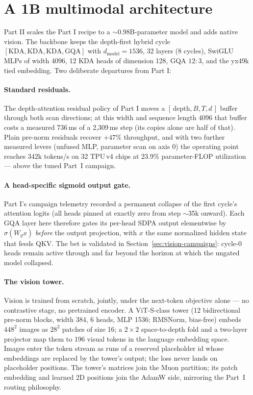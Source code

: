 \section{A 1B multimodal architecture}
\label{sec:vision-arch}

Part II scales the Part I recipe to a $\sim$0.98B-parameter model and
adds native vision. The backbone keeps the depth-first hybrid cycle
\([\mathrm{KDA},\mathrm{KDA},\mathrm{KDA},\mathrm{GQA}]\) with
\(d_{\mathrm{model}}{=}1536\), 32 layers (8 cycles), SwiGLU MLPs of
width 4096, 12 KDA heads of dimension 128, GQA \(12{:}3\), and the
yx49k tied embedding. Two deliberate departures from Part I:

\paragraph{Standard residuals.} The depth-attention residual policy of
Part I moves a \([\,\text{depth},B,T,d\,]\) buffer through both scan
directions; at this width and sequence length 4096 that buffer costs a
measured 736\,ms of a 2{,}309\,ms step (its copies alone are half of
that). Plain pre-norm residuals recover $+47\%$ throughput, and with
two further measured levers (unfused MLP, parameter scan on axis 0)
the operating point reaches 342k tokens/s on 32 TPU\,v4 chips at
23.9\% parameter-FLOP utilization --- above the tuned Part~I campaign.

\paragraph{A head-specific sigmoid output gate.} Part I's campaign
telemetry recorded a permanent collapse of the first cycle's attention
logits (all heads pinned at exactly zero from step $\sim$35k onward).
Each GQA layer here therefore gates its per-head SDPA output
elementwise by \(\sigma(W_g x)\) \emph{before} the output projection,
with \(x\) the same normalized hidden state that feeds QKV. The bet is
validated in Section~\ref{sec:vision-campaigns}: cycle-0 heads remain
active through and far beyond the horizon at which the ungated model
collapsed.

\paragraph{The vision tower.} Vision is trained from scratch, jointly,
under the next-token objective alone --- no contrastive stage, no
pretrained encoder. A ViT-S-class tower (12 bidirectional pre-norm
blocks, width 384, 6 heads, MLP 1536; RMSNorm, bias-free) embeds
\(448^2\) images as \(28^2\) patches of size 16; a \(2{\times}2\)
space-to-depth fold and a two-layer projector map them to 196 visual
tokens in the language embedding space. Images enter the token stream
as runs of a reserved placeholder id whose embeddings are replaced by
the tower's output; the loss never lands on placeholder positions. The
tower's matrices join the Muon partition; its patch embedding and
learned 2D positions join the AdamW side, mirroring the Part~I routing
philosophy.

